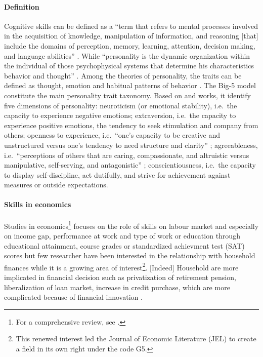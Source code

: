 \documentclass[a4paper, 11pt, onecolumn]{article}
\newcommand{\ie}{i.e.}
\begin{document}
\paragraph{Definition}
Cognitive skills can be defined as a ``term that refers to mental processes involved in the acquisition of knowledge, manipulation of information, and reasoning [that] include the domains of perception, memory, learning, attention, decision making, and language abilities'' \citep{Kiely2014}.
While ``personality is the dynamic organization within the individual of those psychophysical systems that determine his characteristics behavior and thought'' \citep{Allport1961}.
Among the theories of personality, the traits can be defined as thought, emotion and habitual patterns of behavior \citep{Kassin2003}.
The Big-5 model constitute the main personality trait taxonomy.
Based on \cite{Goldberg1981} and \cite{McCrae1987} works, it identify five dimensions of personality: neuroticism (or emotional stability), \ie~the capacity to experience negative emotions; extraversion, \ie~the capacity to experience positive emotions, the tendency to seek stimulation and company from others; openness to experience, \ie~``one’s capacity to be creative and unstructured versus one’s tendency to need structure and clarity'' \citep{Piedmont2014}; agreeableness, \ie~``perceptions of others that are caring, compassionate, and altruistic versus manipulative, self-serving, and antagonistic'' \citep{Piedmont2014}; conscientiousness, \ie~the capacity to display self-discipline, act dutifully, and strive for achievement against measures or outside expectations.	

\paragraph{Skills in economics}
Studies in economics\footnote{For a comprehensive review, see \cite{Almlund2011}.} focuses on the role of skills on labour market and especially on income gap, performance at work and type of work or education through  educational attainment, course grades or standardized achievment test (SAT) scores but few researcher have been interested in the relationship with household finances while it is a growing area of interest\footnote{This renewed interest led the Journal of Economic Literature (JEL) to create a field in its own right under the code G5.}.
[Indeed] Household are more implicated in financial decision such as privatization of retirement pension, liberalization of loan market, increase in credit purchase, which are more complicated because of financial innovation \citep{Guiso2013}.
\end{document}
